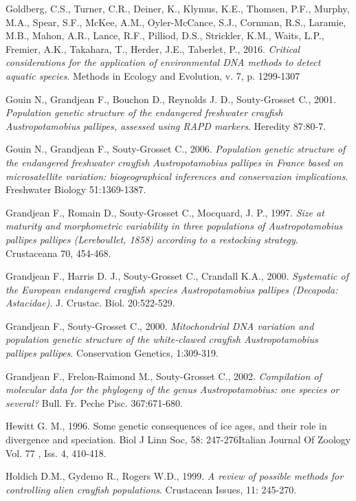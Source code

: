 \documentclass[11pt,a4paper,italian,twoside,openany]{memoir}
\begin{document}
\begin{thebibliography}{9}
 Goldberg, C.S., Turner, C.R., Deiner, K., Klymus, K.E., Thomsen, P.F., Murphy, M.A., Spear, S.F., McKee, A.M., Oyler-McCance, S.J., Cornman, R.S., Laramie, M.B., Mahon, A.R., Lance, R.F., Pilliod, D.S., Strickler, K.M., Waits, L.P., Fremier, A.K., Takahara, T., Herder, J.E., Taberlet, P., 2016. \emph{Critical considerations for the application of environmental DNA methods to detect aquatic species}. Methods in Ecology and Evolution, v. 7, p. 1299-1307

 Gouin N., Grandjean F., Bouchon D., Reynolds J. D., Souty-Grosset C., 2001. \emph{Population genetic structure of the endangered freshwater crayfish Austropotamobius pallipes, assessed using RAPD markers}. Heredity 87:80-7.

 Gouin N., Grandjean F., Souty-Grosset C., 2006. \emph{Population genetic structure of the endangered freshwater crayfish Austropotamobius pallipes in France based on microsatellite variation: biogeographical inferences and conservazion implications}. Freshwater Biology 51:1369-1387.

 Grandjean F., Romain D., Souty-Grosset C., Mocquard, J. P., 1997. \emph{Size at maturity and morphometric variability in three populations of Austropotamobius pallipes pallipes (Lereboullet, 1858) according to a restocking strategy}. Crustaceana 70, 454-468.

 Grandjean F., Harris D. J., Souty-Grosset C., Crandall K.A., 2000. \emph{Systematic of the European endangered crayfish species Austropotamobius pallipes (Decapoda: Astacidae)}. J. Crustac. Biol. 20:522-529.

 Grandjean F., Souty-Grosset C., 2000. \emph{Mitochondrial DNA variation and population genetic structure of the white-clawed crayfish Austropotamobius pallipes pallipes}. Conservation Genetics, 1:309-319.

 Grandjean F., Frelon-Raimond M., Souty-Grosset C., 2002. \emph{Compilation of molecular data for the phylogeny of the genus Austropotamobius: one species or several?} Bull. Fr. Peche Pisc. 367:671-680.

 Hewitt G. M., 1996. Some genetic consequences of ice ages, and their role in divergence and speciation. Biol J Linn Soc, 58: 247-276Italian Journal Of Zoology Vol. 77 , Iss. 4, 410-418.

 Holdich D.M., Gydemo R., Rogers W.D., 1999. \emph{A review of possible methods for controlling alien crayfish populations}. Crustacean Issues, 11: 245-270.


\end{thebibliography}
\end{document}
